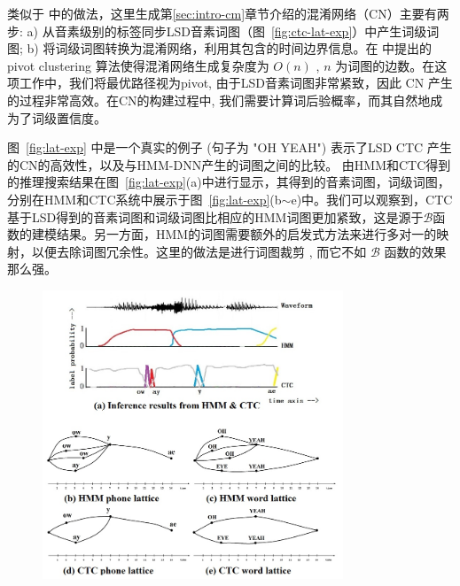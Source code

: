 类似于 \cite{evermann2000large}中的做法，这里生成第\ref{sec:intro-cm}章节介绍的混淆网络（CN）主要有两步: a) 从音素级别的标签同步LSD音素词图（图~\ref{fig:ctc-lat-exp}）中产生词级词图; b) 将词级词图转换为混淆网络，利用其包含的时间边界信息。在 \cite{hakkani2006beyond}中提出的 pivot clustering 算法使得混淆网络生成复杂度为 $O(n)$ , $n$ 为词图的边数。在这项工作中，我们将最优路径视为pivot, 由于LSD音素词图非常紧致，因此 CN 产生的过程非常高效。在CN的构建过程中, 我们需要计算词后验概率，而其自然地成为了词级置信度。





图~\ref{fig:lat-exp} 中是一个真实的例子 (句子为 "OH YEAH") 表示了LSD CTC 产生的CN的高效性，以及与HMM-DNN产生的词图之间的比较。
由HMM和CTC得到的推理搜索结果在图~\ref{fig:lat-exp}(a)中进行显示，其得到的音素词图，词级词图，分别在HMM和CTC系统中展示于图~\ref{fig:lat-exp}(b$\sim$e)中。我们可以观察到，CTC基于LSD得到的音素词图和词级词图比相应的HMM词图更加紧致，这是源于$\mathcal{B}$函数的建模结果。另一方面，HMM的词图需要额外的启发式方法来进行多对一的映射，以便去除词图冗余性。这里的做法是进行词图裁剪 \cite{siniscalchi2013bottom}, 而它不如 $\mathcal{B}$ 函数的效果那么强。


\begin{figure}[htb]
  \centering
    \captionstyle{\centering}
    \includegraphics[width=0.8\textwidth]{figure/lat-exp.jpg}
\end{figure}

